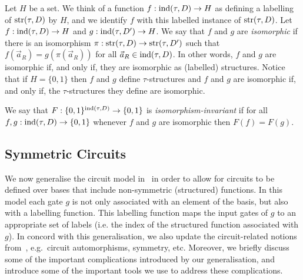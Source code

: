 \documentclass[a4paper,UKenglish]{lipics-v2018}
\begin{document}
Let $H$ be a set. We think of a function $f : \text{\upshape ind}(\tau, D) \rightarrow H$ as
defining a labelling of $\text{str}(\tau,D)$ by $H$, and we identify $f$ with this
labelled instance of $\text{str}(\tau, D)$. Let $f: \text{\upshape ind}(\tau, D) \rightarrow H$ and $g : \text{\upshape ind}
(\tau, D') \rightarrow H$. We say that $f$ and $g$ are \emph{isomorphic} if there is an
isomorphism $\pi : \text{str}(\tau, D) \rightarrow \text{str}(\tau, D')$ such that $f(\vec{a}_R) =
g(\pi(\vec{a}_R))$ for all $\vec{a}_R \in \text{\upshape ind}(\tau, D)$. In other words, $f$
and $g$ are isomorphic if, and only if, they are isomorphic as (labelled)
structures. Notice that if $H = \{0,1\}$ then $f$ and $g$ define
$\tau$-structures and $f$ and $g$ are isomorphic if, and only if, the
$\tau$-structures they define are isomorphic.

We say that $F : \{0,1\}^{\text{\upshape ind}(\tau,D)} \rightarrow \{0,1\}$ is
\emph{isomorphism-invariant} if for all $f, g : \text{\upshape ind}(\tau, D) \rightarrow \{0,1\}$
whenever $f$ and $g$ are isomorphic then $F(f) = F(g)$.

\subsection{Symmetric Circuits}
We now generalise the circuit model in~\cite{AndersonD17} in order to allow for
circuits to be defined over bases that include non-symmetric (structured)
functions. In this model each gate $g$ is not only associated with an element of
the basis, but also with a labelling function. This labelling function maps the
input gates of $g$ to an appropriate set of labels (i.e. the index of the
structured function associated with $g$). In concord with this generalisation,
we also update the circuit-related notions from~\cite{AndersonD17}, e.g.\
circuit automorphisms, symmetry, etc. Moreover, we briefly discuss some of the
important complications introduced by our generalisation, and introduce some of
the important tools we use to address these complications.
\end{document}
